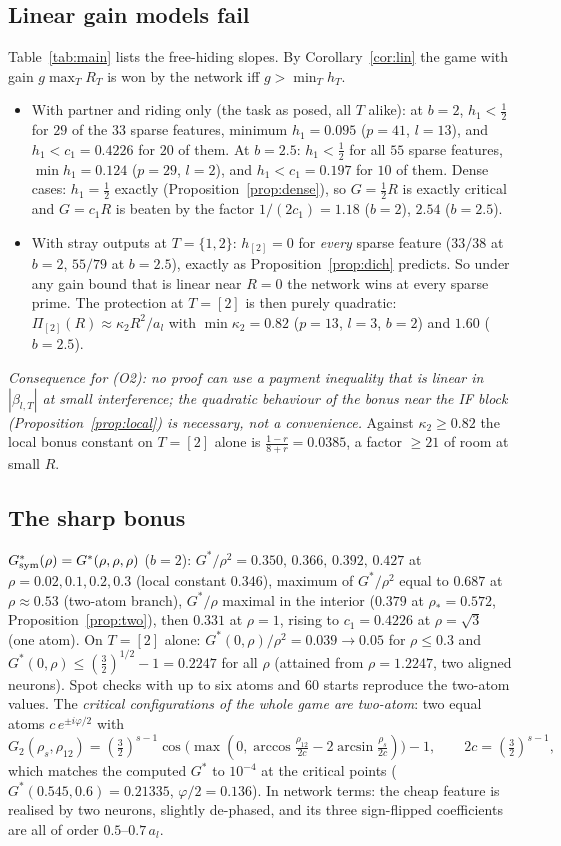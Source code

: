 \documentclass[11pt]{article}
\theoremstyle{definition}
\begin{document}
\subsection{Linear gain models fail}\label{sec:linfail}
Table~\ref{tab:main} lists the free-hiding slopes.  By Corollary~\ref{cor:lin} the game with gain $g\max_TR_T$ is won by the network
iff $g>\min_Th_T$.
\begin{itemize}
\item With partner and riding only (the task as posed, all $T$ alike): at $b=2$, $h_1<\frac12$ for $29$ of the $33$ sparse features, minimum
$h_1=0.095$ ($p=41$, $l=13$), and $h_1<c_1=0.4226$ for $20$ of them.  At $b=2.5$: $h_1<\frac12$ for all $55$ sparse features, $\min h_1=0.124$ ($p=29$, $l=2$),
and $h_1<c_1=0.197$ for $10$ of them.  Dense cases: $h_1=\frac12$ exactly (Proposition~\ref{prop:dense}), so $G=\frac12R$ is exactly critical and $G=c_1R$ is beaten by the
factor $1/(2c_1)=1.18$ ($b=2$), $2.54$ ($b=2.5$).
\item With stray outputs at $T=\{1,2\}$: $h_{[2]}=0$ for \emph{every} sparse feature ($33/38$ at $b=2$, $55/79$ at $b=2.5$), exactly as Proposition~\ref{prop:dich}
predicts.  So under any gain bound that is linear near $R=0$ the network wins at every sparse prime.  The protection at $T=[2]$ is then purely quadratic:
$\Pi_{[2]}(R)\approx\kappa_2R^2/a_l$ with $\min\kappa_2=0.82$ ($p=13$, $l=3$, $b=2$) and $1.60$ ($b=2.5$).
\end{itemize}
\emph{Consequence for (O2): no proof can use a payment inequality that is linear in $|\beta_{l,T}|$ at small interference; the quadratic behaviour of
the bonus near the IF block (Proposition~\ref{prop:local}) is necessary, not a convenience.}  Against $\kappa_2\ge0.82$ the local bonus constant on $T=[2]$
alone is $\frac{1-r}{8+r}=0.0385$, a factor $\ge21$ of room at small $R$.

\subsection{The sharp bonus}
$G^*_{\rm sym}(\rho)=G^*(\rho,\rho,\rho)$ ($b=2$): $G^*/\rho^2=0.350,\,0.366,\,0.392,\,0.427$ at $\rho=0.02,0.1,0.2,0.3$ (local constant $0.346$), maximum of
$G^*/\rho^2$ equal to $0.687$ at $\rho\approx0.53$ (two-atom branch), $G^*/\rho$ maximal in the interior ($0.379$ at $\rho_*=0.572$, Proposition~\ref{prop:two}), then
$0.331$ at $\rho=1$, rising to $c_1=0.4226$ at $\rho=\sqrt3$ (one atom).  On $T=[2]$ alone: $G^*(0,\rho)/\rho^2=0.039\to0.05$ for $\rho\le0.3$ and
$G^*(0,\rho)\le(\frac32)^{1/2}-1=0.2247$ for all $\rho$ (attained from $\rho=1.2247$, two aligned neurons).  Spot checks with up to six atoms and $60$ starts
reproduce the two-atom values.  The \emph{critical configurations of the whole game are two-atom}: two equal atoms $c\,e^{\pm i\varphi/2}$ with
\[G_2(\rho_s,\rho_{12})=(\tfrac32)^{s-1}\cos\big(\max(0,\arccos\tfrac{\rho_{12}}{2c}-2\arcsin\tfrac{\rho_s}{2c})\big)-1,\qquad2c=(\tfrac32)^{s-1},\]
which matches the computed $G^*$ to $10^{-4}$ at the critical points ($G^*(0.545,0.6)=0.21335$, $\varphi/2=0.136$).  In network terms: the cheap feature is
realised by two neurons, slightly de-phased, and its three sign-flipped coefficients are all of order $0.5$--$0.7\,a_l$.
\end{document}
